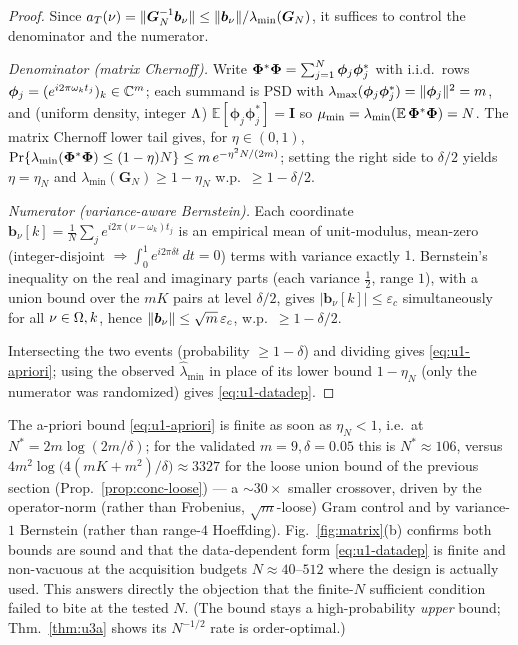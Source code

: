 \begin{proof}
Since $a_T(\nu)=\lVert\bm G_N^{-1}\bm b_\nu\rVert\le\lVert\bm b_\nu\rVert/\lambda_{\min}(\bm G_N)$,
it suffices to control the denominator and the numerator.

\emph{Denominator (matrix Chernoff).}  Write $\bm{\Phi}^{*}\bm{\Phi}=\sum_{j=1}^N\bm\phi_j
\bm\phi_j^{*}$ with i.i.d.\ rows $\bm\phi_j=(e^{i2\pi\omega_k t_j})_k\in\mathbb{C}^m$; each summand is
PSD with $\lambda_{\max}(\bm\phi_j\bm\phi_j^{*})=\lVert\bm\phi_j\rVert^2=m$, and (uniform density,
integer $\Lambda$) $\mathbb E[\bm\phi_j\bm\phi_j^{*}]=\bm I$ so $\mu_{\min}=\lambda_{\min}(\mathbb
E\,\bm{\Phi}^{*}\bm{\Phi})=N$.  The matrix Chernoff lower tail
\cite[Thm.~5.1.1]{tropp2012usertail} gives, for $\eta\in(0,1)$,
$\Pr\{\lambda_{\min}(\bm{\Phi}^{*}\bm{\Phi})\le(1-\eta)N\}\le m\,e^{-\eta^2 N/(2m)}$; setting the
right side to $\delta/2$ yields $\eta=\eta_N$ and $\lambda_{\min}(\bm G_N)\ge1-\eta_N$ w.p.\
$\ge1-\delta/2$.

\emph{Numerator (variance-aware Bernstein).}  Each coordinate
$\bm b_\nu[k]=\frac1N\sum_j e^{i2\pi(\nu-\omega_k)t_j}$ is an empirical mean of unit-modulus,
mean-zero (integer-disjoint $\Rightarrow\int_0^1 e^{i2\pi\delta t}\,dt=0$) terms with variance
exactly $1$.  Bernstein's inequality on the real and imaginary parts (each variance $\tfrac12$,
range $1$), with a union bound over the $mK$ pairs at level $\delta/2$, gives $|\bm
b_\nu[k]|\le\varepsilon_c$ simultaneously for all $\nu\in\Omega,k$, hence $\lVert\bm b_\nu\rVert\le\sqrt
m\,\varepsilon_c$, w.p.\ $\ge1-\delta/2$.

Intersecting the two events (probability $\ge1-\delta$) and dividing gives
\eqref{eq:u1-apriori}; using the observed $\hat\lambda_{\min}$ in place of its lower bound
$1-\eta_N$ (only the numerator was randomized) gives \eqref{eq:u1-datadep}.
\end{proof}

\begin{remark}\label{rmk:u1-crossover}
The a-priori bound \eqref{eq:u1-apriori} is finite as soon as $\eta_N<1$, i.e.\ at
$N^{*}=2m\log(2m/\delta)$; for the validated $m=9,\delta=0.05$ this is $N^{*}\approx106$, versus
$4m^2\log\!\big(4(mK+m^2)/\delta\big)\approx3327$ for the loose union bound of the previous
section (Prop.~\ref{prop:conc-loose}) --- a $\sim\!30\times$ smaller crossover, driven by the
operator-norm (rather than Frobenius, $\sqrt m$-loose) Gram control and by variance-$1$
Bernstein (rather than range-$4$ Hoeffding).  Fig.~\ref{fig:matrix}(b) confirms both bounds
are sound and that the data-dependent form \eqref{eq:u1-datadep} is finite and non-vacuous at
the acquisition budgets $N\!\approx\!40$--$512$ where the design is actually used.  This
answers directly the objection that the finite-$N$ sufficient condition failed to bite at the
tested $N$.  (The bound stays a high-probability \emph{upper} bound; Thm.~\ref{thm:u3a} shows
its $N^{-1/2}$ rate is order-optimal.)
\end{remark}
